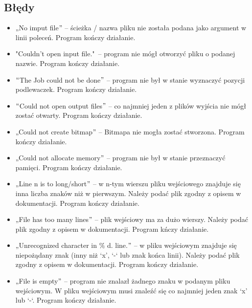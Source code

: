 \documentclass[12pt]{article}
\renewcommand{\_}{\kern-1.5pt\textunderscore\kern-1.5pt}
\begin{document}
\subsection*{Błędy}
\begin{itemize}
	\item „No imput file$"$  – ścieżka / nazwa pliku nie została podana jako argument w linii poleceń. Program kończy działanie.\par

	\item "Couldn't open input file."\ – program nie mógł  otworzyć pliku o podanej nazwie. Program kończy działanie.\par

	\item $``$The Job could not be done$"$  – program nie był w stanie wyznaczyć pozycji podlewaczek. Program kończy działanie.\par

	\item $``$Could not open output files$"$  – co najmniej jeden z plików wyjścia nie mógł zostać otwarty. Program kończy działanie.\par

	\item „Could not create bitmap$"$  – Bitmapa nie mogła zostać stworzona. Program kończy działanie.\par

	\item „Could not allocate memory$"$  – program nie był w stanie przeznaczyć pamięci. Program kończy działanie.\par

	\item „Line n is to long/short$"$  – w n-tym wierszu pliku wejściowego znajduje się inna liczba znaków niż w pierwszym. Należy podać plik zgodny z opisem w dokumentacji. Program kończy działanie.\par

	\item „File has too many lines$"$  – plik wejściowy ma za dużo wierszy. Należy podać plik zgodny z opisem w dokumentacji. Program kńczy działanie.\par

	\item „Unrecognized character in $\%$ d. line.$"$  – w pliku wejściowym znajduje się niepożądany znak (inny niż ‘x’, ‘-‘ lub znak końca linii). Należy podać plik zgodny z opisem w dokumentacji. Program kończy działanie.\par

	\item „File is empty$"$  – program nie znalazł żadnego znaku w podanym pliku wejściowym. W pliku wejściowym musi znaleźć się co najmniej jeden znak ‘x’ lub ‘-‘. Program kończy działanie.
\end{itemize}\par


\printbibliography
\end{document}
